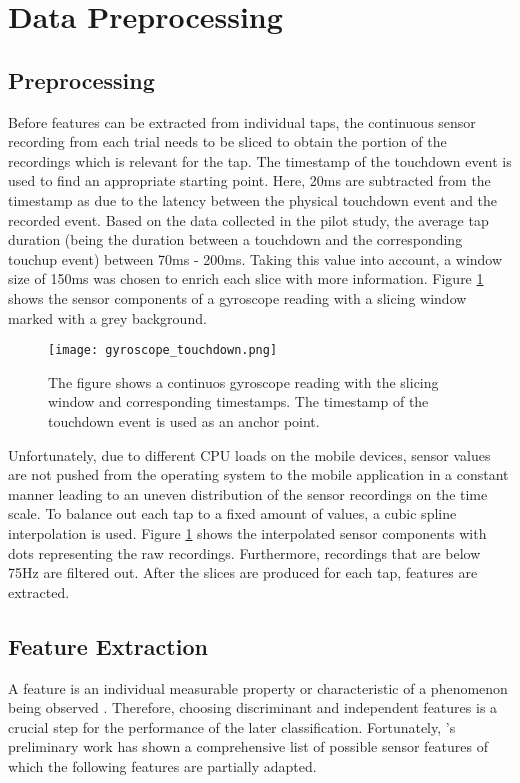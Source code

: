 \section{Data Preprocessing \label{cha:chapter4}}
\subsection{Preprocessing}
Before features can be extracted from individual taps, the continuous sensor recording from each trial needs to be sliced to obtain the portion of the recordings which is relevant for the tap. The timestamp of the touchdown event is used to find an appropriate starting point. Here, 20ms are subtracted from the timestamp as due to the latency between the physical touchdown event and the recorded event. Based on the data collected in the pilot study, the average tap duration (being the duration between a touchdown and the corresponding touchup event) between 70ms - 200ms. Taking this value into account, a window size of 150ms was chosen to enrich each slice with more information. Figure \ref{fig:touchdown} shows the sensor components of a gyroscope reading with a slicing window marked with a grey background. 

\begin{figure}[h!]
  \centering
  \texttt{[image: gyroscope\_touchdown.png]}
  \caption{The figure shows a continuos gyroscope reading with the slicing window and corresponding timestamps. The timestamp of the touchdown event is used as an anchor point.} \label{fig:touchdown}
\end{figure}

Unfortunately, due to different CPU loads on the mobile devices, sensor values are not pushed from the operating system to the mobile application in a constant manner leading to an uneven distribution of the sensor recordings on the time scale. To balance out each tap to a fixed amount of values, a cubic spline interpolation is used. Figure \ref{fig:touchdown} shows the interpolated sensor components with dots representing the raw recordings. Furthermore, recordings that are below 75Hz are filtered out. After the slices are produced for each tap, features are extracted.

\subsection{Feature Extraction}
A feature is an individual measurable property or characteristic of a phenomenon being observed \cite{Duda:2000:PC:954544}. Therefore, choosing discriminant and independent features is a crucial step for the performance of the later classification. Fortunately, \citeauthor{Tapprints}'s preliminary work has shown a comprehensive list of possible sensor features of which the following features are partially adapted.

